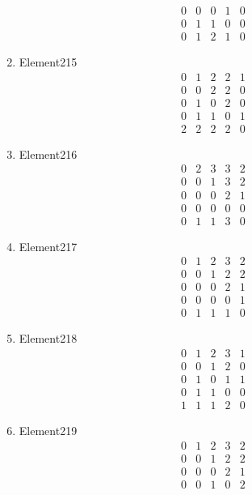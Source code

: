 \documentclass[12pt]{article}
\begin{document}
\begin{multicols}{3}
\begin{enumerate}
\begin{equation*}
\begin{array}{ccccc}
0&0&0&1&0\\
0&1&1&0&0\\
0&1&2&1&0
\end{array}
\end{equation*}
\item Element215
\begin{equation*}
\begin{array}{ccccc}
0&1&2&2&1\\
0&0&2&2&0\\
0&1&0&2&0\\
0&1&1&0&1\\
2&2&2&2&0
\end{array}
\end{equation*}
\item Element216
\begin{equation*}
\begin{array}{ccccc}
0&2&3&3&2\\
0&0&1&3&2\\
0&0&0&2&1\\
0&0&0&0&0\\
0&1&1&3&0
\end{array}
\end{equation*}
\item Element217
\begin{equation*}
\begin{array}{ccccc}
0&1&2&3&2\\
0&0&1&2&2\\
0&0&0&2&1\\
0&0&0&0&1\\
0&1&1&1&0
\end{array}
\end{equation*}
\item Element218
\begin{equation*}
\begin{array}{ccccc}
0&1&2&3&1\\
0&0&1&2&0\\
0&1&0&1&1\\
0&1&1&0&0\\
1&1&1&2&0
\end{array}
\end{equation*}
\item Element219
\begin{equation*}
\begin{array}{ccccc}
0&1&2&3&2\\
0&0&1&2&2\\
0&0&0&2&1\\
0&0&1&0&2\\

\end{array}
\end{equation*}
\end{enumerate}
\end{multicols}
\end{document}
